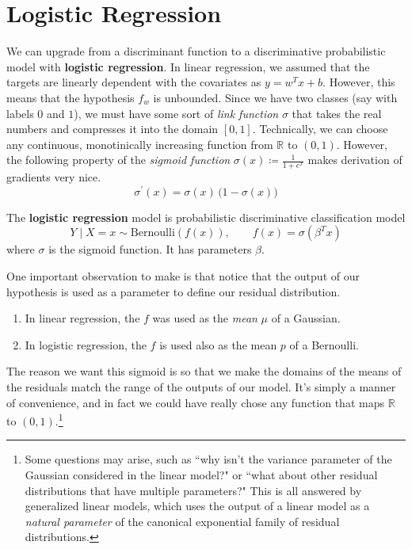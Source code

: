 \section{Logistic Regression} 

  We can upgrade from a discriminant function to a discriminative probabilistic model with \textbf{logistic regression}. In linear regression, we assumed that the targets are linearly dependent with the covariates as $y = w^T x + b$. However, this means that the hypothesis $f_w$ is unbounded. Since we have two classes (say with labels $0$ and $1$), we must have some sort of \textit{link function} $\sigma$ that takes the real numbers and compresses it into the domain $[0, 1]$. Technically, we can choose any continuous, monotinically increasing function from $\mathbb{R}$ to $(0, 1)$. However, the following property of the \textit{sigmoid function} $\sigma(x) \coloneqq \frac{1}{1 + e^{x}}$ makes derivation of gradients very nice. \begin{equation}
    \sigma^\prime (x) = \sigma(x) \, \big(1 - \sigma(x) \big)
  \end{equation}

  \begin{definition}
    The \textbf{logistic regression} model is probabilistic discriminative classification model  
    \begin{equation}
      Y \mid X = x \sim \mathrm{Bernoulli}(f(x)), \qquad f(x) = \sigma(\beta^T x)
    \end{equation}
    where $\sigma$ is the sigmoid function. It has parameters $\beta$. 
  \end{definition} 

  One important observation to make is that notice that the output of our hypothesis is used as a parameter to define our residual distribution. 
  \begin{enumerate}
    \item In linear regression, the $f$ was used as the \textit{mean} $\mu$ of a Gaussian. 
    \item In logistic regression, the $f$ is used also as the mean $p$ of a Bernoulli. 
  \end{enumerate}
  The reason we want this sigmoid is so that we make the domains of the means of the residuals match the range of the outputs of our model. It's simply a manner of convenience, and in fact we could have really chose any function that maps $\mathbb{R}$ to $(0, 1)$.\footnote{Some questions may arise, such as ``why isn't the variance parameter of the Gaussian considered in the linear model?" or ``what about other residual distributions that have multiple parameters?" This is all answered by generalized linear models, which uses the output of a linear model as a \textit{natural parameter} of the canonical exponential family of residual distributions. }

